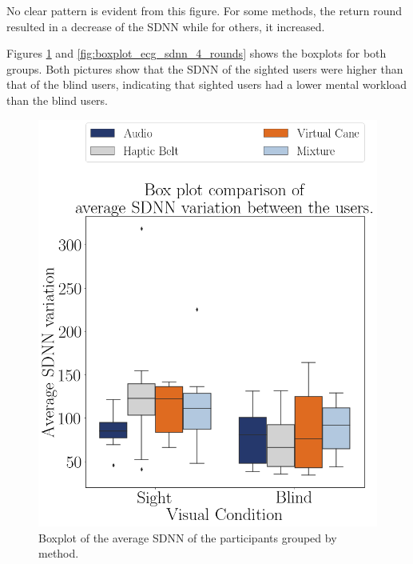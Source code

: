 No clear pattern is evident from this figure. For some methods, the return round resulted in a decrease of the SDNN while for others, it increased. 

Figures \ref{fig:boxplot_ecg_sdnn_4_scene} and \ref{fig:boxplot_ecg_sdnn_4_rounds} shows the boxplots for both groups. Both pictures show that the SDNN of the sighted users were higher than that of the blind users, indicating that sighted users had a lower mental workload than the blind users.

\begin{figure}[!htb]
    \centering
    \begin{minipage}{0.45\textwidth}
        \centering
        \includegraphics[width = 0.8\linewidth]{Resultados/ECG/Figuras/png/boxplot_ecg_sdnn_4_scene.png}
        \caption{Boxplot of the average SDNN of the participants grouped by method.}
        \label{fig:boxplot_ecg_sdnn_4_scene}
    \end{minipage}
    \begin{minipage}{0.45\textwidth}
        \centering

\end{minipage}
\end{figure}
